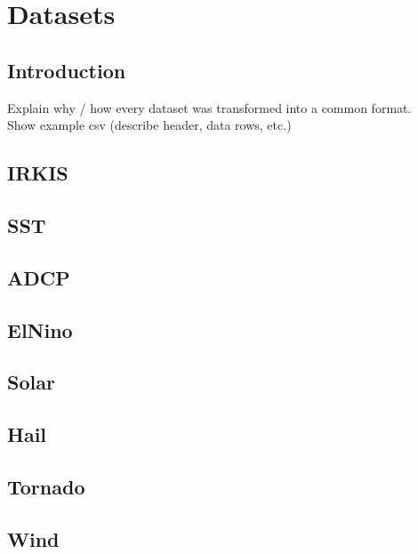 
\chapter{Datasets} %

\label{datasets} %


\section{Introduction}
\label{datasets:intro}

Explain why / how every dataset was transformed into a common format.\\
Show example csv (describe header, data rows, etc.)



\section{IRKIS}
\label{datasets:irkis}

\section{SST}
\label{datasets:sst}

\section{ADCP}
\label{datasets:adcp}

\section{ElNino}
\label{datasets:elnino}

\section{Solar}
\label{datasets:solar}

\section{Hail}
\label{datasets:hail}

\section{Tornado}
\label{datasets:tornado}

\section{Wind}
\label{datasets:wind}